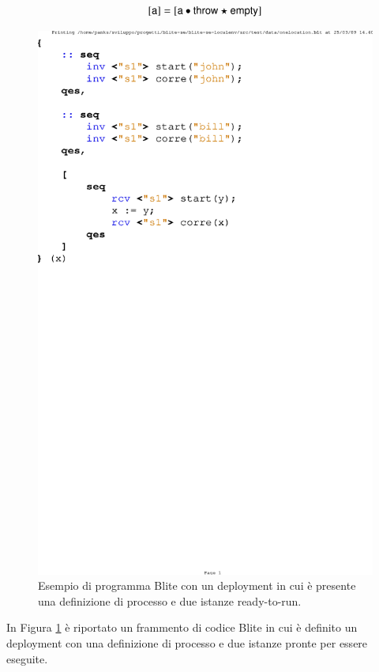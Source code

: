 $$
{\sf [a]} = [{\sf a} \bullet {\sf throw} \star {\sf empty}]
$$

\begin{figure}[!t]
\begin{center}
  \includegraphics[scale=0.80,clip]{linguaggio/dia/blt2}
   \caption[Codice Blite, esempio ready to run instance]{Esempio di programma
   Blite con un deployment in cui è presente una definizione di processo e due
   istanze ready-to-run.}
  \label{fig:lin:blt2}
\end{center}
\end{figure}

In Figura \ref{fig:lin:blt2} è riportato un frammento di codice Blite in cui è
definito un deployment con una definizione di processo e due istanze pronte per
essere eseguite.

